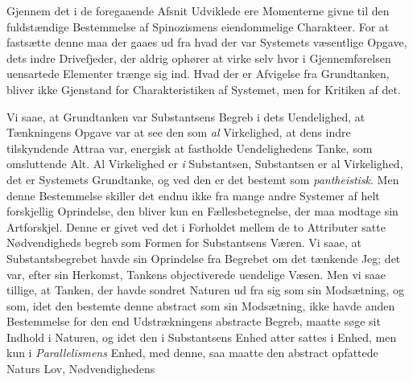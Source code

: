 \documentclass[12pt,a4paper]{book}
\newcommand{\opage}[1]{\marginnote{\footnotesize\textit{[#1]}}}
\begin{document}
Gjennem det i de foregaaende Afsnit Udviklede ere
Momenterne givne til den fuldstændige Bestemmelse af Spinozismens
eiendommelige Charakteer. For at fastsætte denne
maa der gaaes ud fra hvad der var Systemets væsentlige
Opgave, dets indre Drivefjeder, der aldrig ophører at virke
selv hvor i Gjennemførelsen uensartede Elementer trænge
sig ind. Hvad der er Afvigelse fra Grundtanken, bliver ikke
Gjenstand for Charakteristiken af Systemet, men for Kritiken
af det.

Vi saae, at Grundtanken var Substantsens Begreb i dets
Uendelighed, at Tænkningens Opgave var at see den som \emph{al}
Virkelighed, at dens indre tilskyndende Attraa var, energisk
at fastholde Uendelighedens Tanke, som omsluttende
Alt. Al Virkelighed er \textit{i} Substantsen, Substantsen er al
Virkelighed, det er Systemets Grundtanke, og ved den er
det bestemt som \emph{pantheistisk}. Men denne Bestemmelse
skiller det endnu ikke fra mange andre Systemer af helt
forskjellig Oprindelse, den bliver kun en Fællesbetegnelse,
der maa modtage sin Artforskjel. Denne er givet ved det
i Forholdet mellem de to Attributer satte Nødvendigheds\-%
\opage{172}begreb som Formen for Substantsens Væren. Vi saae, at
Substantsbegrebet havde sin Oprindelse fra Begrebet om det
tænkende Jeg; det var, efter sin Herkomst, Tankens objectiverede
uendelige Væsen. Men vi saae tillige, at Tanken,
der havde sondret Naturen ud fra sig som sin Modsætning,
og som, idet den bestemte denne abstract som sin Modsætning,
ikke havde anden Bestemmelse for den end Udstrækningens
abstracte Begreb, maatte søge sit Indhold i
Naturen, og idet den i Substantsens Enhed atter sattes i
Enhed, men kun i \emph{Parallelismens} Enhed, med denne,
saa maatte den abstract opfattede Naturs Lov, Nødvendighedens
\end{document}
